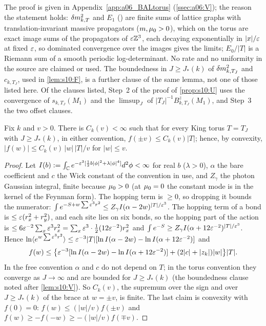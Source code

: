The proof is given in Appendix~\ref{app:a06_BALtorus} (\cref{ssec:a06:V}); the reason the statement holds: $\delta m^2_{k,T}$ and $E_1$ (\cite[(3.32)--(3.33), (3.35)]{K1}) are finite sums of lattice graphs with translation-invariant massive propagators ($m,\mu_0>0$), which on the torus are exact image sums of the propagators of $\varepsilon\mathbb Z^3$, each decaying exponentially in $|x|/\varepsilon$ at fixed $\varepsilon$, so dominated convergence over the images gives the limits; $E_0/|T|$ is a Riemann sum of a smooth periodic log-determinant. No rate and no uniformity in the source are claimed or used. The boundedness in $J\ge J_*(k)$ of $\delta m^2_{k,T_J}$ and $c_{k,T_J}$, used in \cref{lem:s10:F}, is a further clause of the same lemma, not one of those listed here. Of the clauses listed, Step~2 of the proof of \cref{prop:s10:U} uses the convergence of $s_{k,T_J}(M_1)$ and the $\limsup_J$ of $|T_J|^{-1}B^z_{k,T_J}(M_1)$, and Step~3 the two offset clauses.

\begin{lemma}\label{lem:s10:F}
Fix $k$ and $v>0$. There is $C_k(v)<\infty$ such that for every King torus $T=T_J$ with $J\ge J_*(k)$, in either convention, $f(\pm v)\le C_k(v)|T|$; hence, by convexity, $|f(w)|\le C_k(v)\,|w|\,|T|/v$ for $|w|\le v$.
\end{lemma}

\begin{proof}
Let $I(b):=\int_{\mathbb C} e^{-\varepsilon^3[\frac12b|\phi|^2+\lambda|\phi|^4]}d^2\phi<\infty$ for real $b$ ($\lambda>0$), $\alpha$ the bare coefficient and $c$ the Wick constant of the convention in use, and $Z_\gamma$ the photon Gaussian integral, finite because $\mu_0>0$ (at $\mu_0=0$ the constant mode is in the kernel of the Feynman form). The hopping term is $\ge0$, so dropping it bounds the numerator: $\int e^{-S+w\sum\varepsilon^3r^2}\le Z_\gamma I(\alpha-2w)^{|T|/\varepsilon^3}$. The hopping term of a bond is $\le\varepsilon(r_x^2+r_y^2)$, and each site lies on six bonds, so the hopping part of the action is $\le6\varepsilon^{-2}\sum_x\varepsilon^3r_x^2=\sum_x\varepsilon^3\cdot\frac12(12\varepsilon^{-2})r_x^2$ and $\int e^{-S}\ge Z_\gamma I(\alpha+12\varepsilon^{-2})^{|T|/\varepsilon^3}$. Hence $\ln\langle e^{w\sum\varepsilon^3r^2}\rangle\le\varepsilon^{-3}|T|[\ln I(\alpha-2w)-\ln I(\alpha+12\varepsilon^{-2})]$ and
\[
f(w)\le\big\{\varepsilon^{-3}[\ln I(\alpha-2w)-\ln I(\alpha+12\varepsilon^{-2})]+(2|c|+|z_k|)|w|\big\}|T| .
\]
In the free convention $\alpha$ and $c$ do not depend on $T$; in the torus convention they converge as $J\to\infty$ and are bounded for $J\ge J_*(k)$ (the boundedness clause noted after \cref{lem:s10:V}). So $C_k(v)$, the supremum over the sign and over $J\ge J_*(k)$ of the brace at $w=\pm v$, is finite. The last claim is convexity with $f(0)=0$: $f(w)\le(|w|/v)f(\pm v)$ and $f(w)\ge-f(-w)\ge-(|w|/v)f(\mp v)$.
\end{proof}

